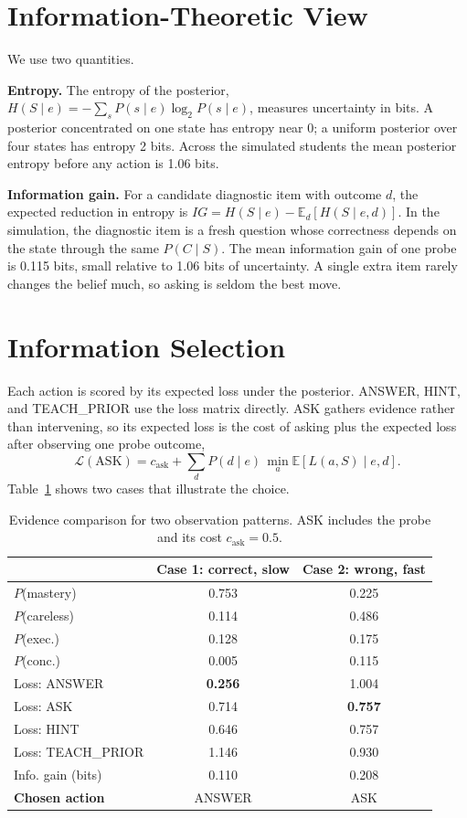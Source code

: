 \documentclass[10pt,letterpaper,twocolumn]{article}
\begin{document}
\section{Information-Theoretic View}
We use two quantities.

\textbf{Entropy.} The entropy of the posterior, $H(S\mid e) = -\sum_s P(s\mid e)\log_2 P(s\mid e)$, measures uncertainty in bits. A posterior concentrated on one state has entropy near 0; a uniform posterior over four states has entropy 2 bits. Across the simulated students the mean posterior entropy before any action is 1.06 bits.

\textbf{Information gain.} For a candidate diagnostic item with outcome $d$, the expected reduction in entropy is $IG = H(S\mid e) - \mathbb{E}_d[H(S\mid e,d)]$. In the simulation, the diagnostic item is a fresh question whose correctness depends on the state through the same $P(C\mid S)$. The mean information gain of one probe is 0.115 bits, small relative to 1.06 bits of uncertainty. A single extra item rarely changes the belief much, so asking is seldom the best move.

\section{Information Selection}
Each action is scored by its expected loss under the posterior. ANSWER, HINT, and TEACH\_PRIOR use the loss matrix directly. ASK gathers evidence rather than intervening, so its expected loss is the cost of asking plus the expected loss after observing one probe outcome,
\[
\mathcal{L}(\text{ASK}) = c_{\text{ask}} + \sum_d P(d\mid e)\,\min_a \mathbb{E}[L(a,S)\mid e,d].
\]
Table~\ref{tab:evidence} shows two cases that illustrate the choice.

\begin{table}[t]
\centering
\footnotesize
\caption{Evidence comparison for two observation patterns. ASK includes the probe and its cost $c_{\text{ask}}=0.5$.}
\label{tab:evidence}
\begin{tabular}{@{}lcc@{}}
\toprule
 & Case 1: correct, slow & Case 2: wrong, fast \\
\midrule
$P$(mastery) & 0.753 & 0.225 \\
$P$(careless) & 0.114 & 0.486 \\
$P$(exec.) & 0.128 & 0.175 \\
$P$(conc.) & 0.005 & 0.115 \\
Loss: ANSWER & \textbf{0.256} & 1.004 \\
Loss: ASK & 0.714 & \textbf{0.757} \\
Loss: HINT & 0.646 & 0.757 \\
Loss: TEACH\_PRIOR & 1.146 & 0.930 \\
Info. gain (bits) & 0.110 & 0.208 \\
\textbf{Chosen action} & ANSWER & ASK \\
\bottomrule
\end{tabular}
\end{table}
\end{document}
